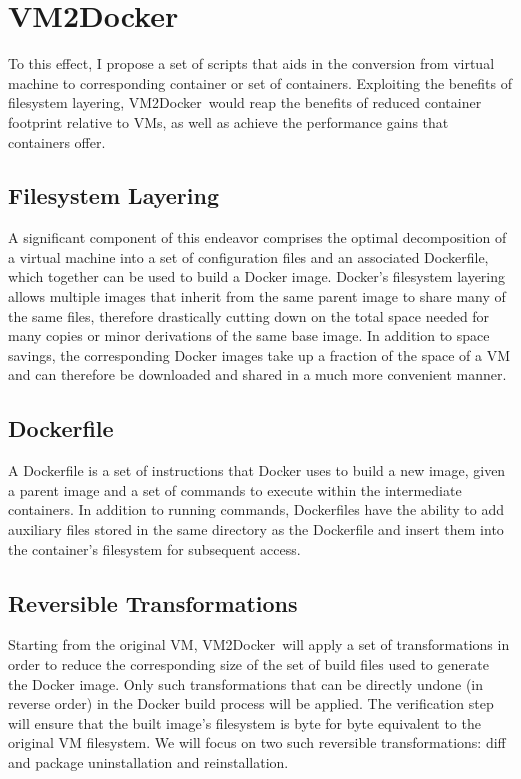 \documentclass[\myfontsize, letterpaper]{article}
\newcommand{\projectname}{VM2Docker}
\begin{document}
\section{\projectname}
\label{sec:project}
To this effect, I propose a set of scripts that aids in the conversion from virtual machine to corresponding container or set of containers. Exploiting the benefits of filesystem layering, \projectname\ would reap the benefits of reduced container footprint relative to VMs, as well as achieve the performance gains that containers offer.

\subsection{Filesystem Layering}
A significant component of this endeavor comprises the optimal decomposition of a virtual machine into a set of configuration files and an associated Dockerfile, which together can be used to build a Docker image. Docker's filesystem layering allows multiple images that inherit from the same parent image to share many of the same files, therefore drastically cutting down on the total space needed for many copies or minor derivations of the same base image. In addition to space savings, the corresponding Docker images take up a fraction of the space of a VM and can therefore be downloaded and shared in a much more convenient manner.


\subsection{Dockerfile}
A Dockerfile is a set of instructions that Docker uses to build a new image, given a parent image and a set of commands to execute within the intermediate containers. In addition to running commands, Dockerfiles have the ability to add auxiliary files stored in the same directory as the Dockerfile and insert them into the container's filesystem for subsequent access.

\subsection{Reversible Transformations}
Starting from the original VM, \projectname\ will apply a set of transformations in order to reduce the corresponding size of the set of build files used to generate the Docker image. Only such transformations that can be directly undone (in reverse order) in the Docker build process will be applied. The verification step will ensure that the built image's filesystem is byte for byte equivalent to the original VM filesystem. We will focus on two such reversible transformations: diff and package uninstallation and reinstallation.
\end{document}
